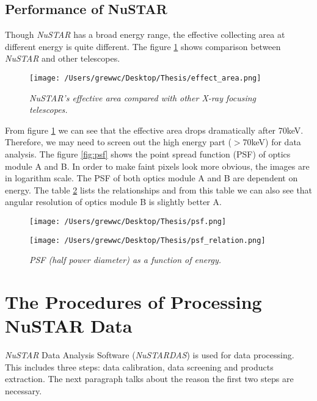 \documentclass[12pt]{report}
\newcommand{\mycaption}[1]{\caption{\textit{\footnotesize #1}}}
\begin{document}
        \subsection{Performance of NuSTAR}
            Though \textit{NuSTAR} has a broad energy range, the effective collecting area at different energy is 
            quite different. The figure \ref{fig:effective_area} shows comparison between \textit{NuSTAR} and other 
            telescopes.
            \begin{figure}[h!]
              \centering
              \texttt{[image: /Users/grewwc/Desktop/Thesis/effect\_area.png]}
              \mycaption{\textit{NuSTAR}'s effective area compared with other X-ray focusing telescopes.}
              \label{fig:effective_area}
            \end{figure}
            
            From figure \ref{fig:effective_area} we can see that the effective area drops dramatically after 70keV.
            Therefore, we may need to screen out the high energy part ($>$70keV) for data analysis.
            The figure \ref{fig:psf} shows the point spread function (PSF) of optics module A and B. In order to
            make faint pixels look more obvious, the images are in logarithm scale. The PSF of both optics module A
            and B are dependent on energy. The table \ref{table:psf_relation} lists the relationships and from this 
            table we can also see that angular resolution of optics module B is slightly better A.
            
             
            \begin{figure}[!htp]
              \centering
              \texttt{[image: /Users/grewwc/Desktop/Thesis/psf.png]}
              \mycaption{Image of NuSTAR's point spread function of optics module A(left) and B(right).}
              \label{fig:psf}
              \vspace{1.5cm} 
              \texttt{[image: /Users/grewwc/Desktop/Thesis/psf\_relation.png]}
              \mycaption{PSF (half power diameter) as a function of energy.}
              \label{table:psf_relation}
            \end{figure}

        \section{The Procedures of Processing NuSTAR Data}
            \textit{NuSTAR} Data Analysis Software (\textit{NuSTARDAS}) is used for data processing. This includes 
            three steps:
            data calibration, data screening and products extraction. The next paragraph talks about the reason the 
            first two steps are necessary. 
\end{document}
